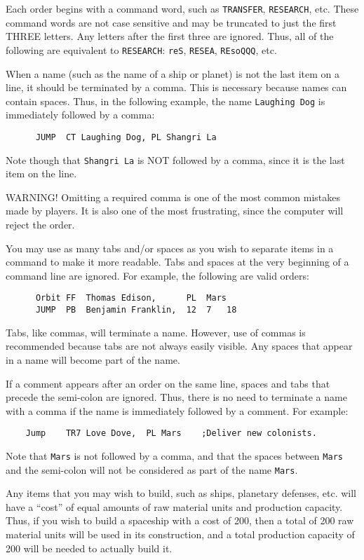 \documentclass[10pt,titlepage]{article}
\begin{document}
Each order begins with a command word, such as \texttt{TRANSFER}, \texttt{RESEARCH}, etc.
These command words are not case sensitive and may be truncated to just the
first THREE letters.  Any letters after the first three are ignored.  Thus, all
of the following are equivalent to \texttt{RESEARCH}: \texttt{reS}, \texttt{RESEA}, \texttt{REsoQQQ}, etc.

When a name (such as the name of a ship or planet) is not the last item on a
line, it should be terminated by a comma.  This is necessary because names can
contain spaces.  Thus, in the following example, the name \texttt{Laughing Dog} is
immediately followed by a comma:
\begin{verbatim}
      JUMP	CT Laughing Dog, PL Shangri La
\end{verbatim}
Note though that \texttt{Shangri La} is NOT followed by a comma, since it is the last
item on the line.

\begin{warningnote}
	WARNING! Omitting a required comma is one of the most common
	mistakes made by players.  It is also one of the most frustrating,
	since the computer will reject the order.
\end{warningnote}

\noindent You may use as many tabs and/or spaces as you wish to separate items in a
command to make it more readable.  Tabs and spaces at the very beginning of a
command line are ignored.  For example, the following are valid orders:
\begin{verbatim}
      Orbit	FF	Thomas Edison,		PL	Mars
      JUMP	PB	Benjamin Franklin,	12	7	18
\end{verbatim}
Tabs, like commas, will terminate a name.  However, use of commas is
recommended because tabs are not always easily visible.  Any spaces that
appear in a name will become part of the name.

If a comment appears after an order on the same line, spaces and tabs that
precede the semi-colon are ignored.  Thus, there is no need to terminate a name
with a comma if the name is immediately followed by a comment.  For example:
\begin{verbatim}
	Jump	TR7 Love Dove,	PL Mars    ;Deliver new colonists.
\end{verbatim}
Note that \texttt{Mars} is not followed by a comma, and that the spaces between \texttt{Mars}
and the semi-colon will not be considered as part of the name \texttt{Mars}.

Any items that you may wish to build, such as ships, planetary defenses, etc.
will have a ``cost'' of equal amounts of raw material units and production
capacity.  Thus, if you wish to build a spaceship with a cost of 200, then
a total of 200 raw material units will be used in its construction, and a
total production capacity of 200 will be needed to actually build it.
\end{document}

